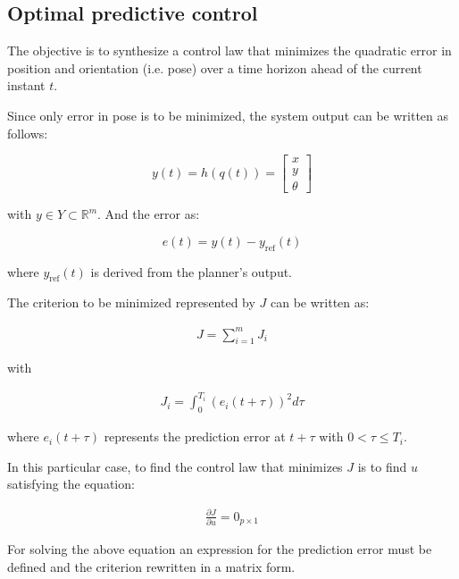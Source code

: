 \documentclass[letterpaper, 10 pt, conference]{ieeeconf}  %
\begin{document}

\subsection{Optimal predictive control}

The objective is to synthesize a control law that minimizes the quadratic error in position and orientation (i.e. pose) over a time horizon ahead of the current instant $t$.

Since only error in pose is to be minimized, the system output can be written as follows:

\[
y(t) = h(q(t)) = \left[\begin{array}{c}
x\\
y\\
\theta
\end{array}
\right]
\]

with ${y \in Y \subset \mathds{R}^m}$. And the error as:

\[
	e(t) =  y(t) - y_{\text{ref}}(t)
\]

where ${y_{\text{ref}}(t)}$ is derived from the planner's output.

The criterion to be minimized represented by $J$ can be written as:

\begin{align*}
J = \sum_{i=1}^m J_i 
\end{align*}

with

\begin{align*}
J_i = \int_0^{T_i} (e_i(t+\tau))^2d\tau
\end{align*}

where ${e_i(t+\tau)}$ represents the prediction error at ${t+\tau}$ with ${0 < \tau \leq T_i}$.

In this particular case, to find the control law that minimizes $J$ is to find $u$ satisfying the equation:

\begin{align*}
\frac{\partial J}{\partial u} = 0_{p\times 1}
\end{align*}

For solving the above equation an expression for the prediction error must be defined and the criterion rewritten in a matrix form.

\end{document}
